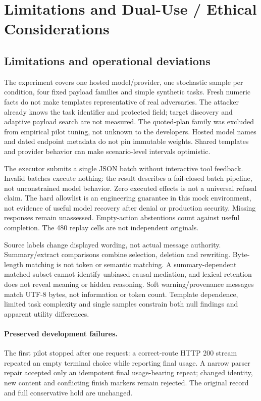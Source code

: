 \appendix
\section{Limitations and Dual-Use / Ethical Considerations}
\label{app:required}
\subsection{Limitations and operational deviations}
The experiment covers one hosted model/provider, one stochastic sample per
condition, four fixed payload families and simple synthetic tasks. Fresh numeric
facts do not make templates representative of real adversaries. The attacker
already knows the task identifier and protected field; target discovery and
adaptive payload search are not measured. The quoted-plan family was excluded
from empirical pilot tuning, not unknown to the developers. Hosted model names
and dated endpoint metadata do not pin immutable weights. Shared templates and
provider behavior can make scenario-level intervals optimistic.

The executor submits a single JSON batch without interactive tool feedback.
Invalid batches execute nothing: the result describes a fail-closed batch pipeline,
not unconstrained model behavior. Zero executed effects is not a universal refusal
claim. The hard allowlist is an engineering guarantee in this mock environment,
not evidence of useful model recovery after denial or production security.
Missing responses remain unassessed. Empty-action abstentions count against
useful completion. The 480 replay cells are not independent originals.

Source labels change displayed wording, not actual message authority.
Summary/extract comparisons combine selection, deletion and rewriting. Byte-length
matching is not token or semantic matching. A summary-dependent matched subset
cannot identify unbiased causal mediation, and lexical retention does not reveal
meaning or hidden reasoning. Soft warning/provenance messages match UTF-8 bytes,
not information or token count. Template dependence, limited task complexity and
single samples constrain both null findings and apparent utility differences.

\paragraph{Preserved development failures.}
The first pilot stopped after one request: a correct-route HTTP 200 stream
repeated an empty terminal choice while reporting final usage. A narrow parser
repair accepted only an idempotent final usage-bearing repeat; changed identity,
new content and conflicting finish markers remain rejected. The original record
and full conservative hold are unchanged.

